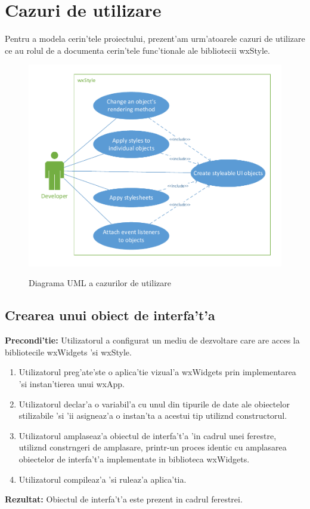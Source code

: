 \clearpage

\section{Cazuri de utilizare}

Pentru a modela cerin'tele proiectului, prezent'am urm'atoarele cazuri de utilizare ce au rolul de a documenta cerin'tele func'tionale ale bibliotecii wxStyle.

\begin{figure}[H]
	\centering 
	\includegraphics{img/use_case.pdf}
	\label{fig0401}
    \caption{Diagrama UML a cazurilor de utilizare}
\end{figure}

\subsection{Crearea unui obiect de interfa't'a}
\textbf{Precondi'tie:} Utilizatorul a configurat un mediu de dezvoltare care are acces la bibliotecile wxWidgets 'si wxStyle.
\begin{enumerate}
\item Utilizatorul preg'ate'ste o aplica'tie vizual'a wxWidgets prin implementarea 'si instan'tierea unui wxApp.
\item Utilizatorul declar'a o variabil'a cu unul din tipurile de date ale obiectelor stilizabile 'si 'ii asigneaz'a o instan'ta a acestui tip utiliz{\ia}nd constructorul.
\item Utilizatorul amplaseaz'a obiectul de interfa't'a 'in cadrul unei ferestre, utiliz{\ia}nd constr{\ia}ngeri de amplasare, printr-un proces identic cu amplasarea obiectelor de interfa't'a implementate in biblioteca wxWidgets.
\item Utilizatorul compileaz'a 'si ruleaz'a aplica'tia.
\end{enumerate}
\textbf{Rezultat:} Obiectul de interfa't'a este prezent in cadrul ferestrei.

